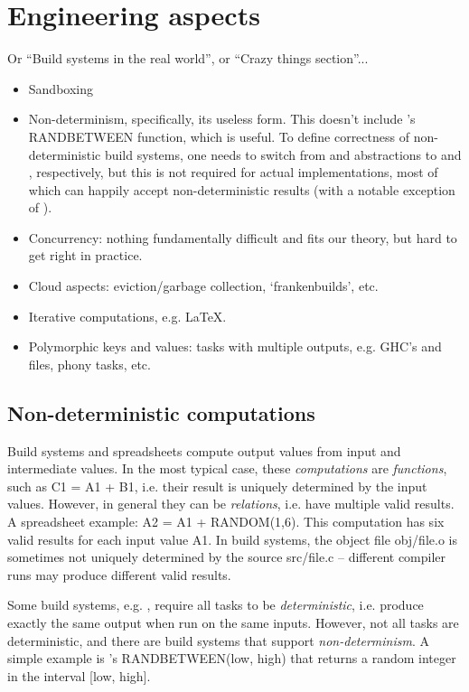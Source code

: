 \clearpage
\section{Engineering aspects}\label{sec-engineering}

Or ``Build systems in the real world'', or ``Crazy things section''...

\begin{itemize}
    \item Sandboxing
    \item Non-determinism, specifically, its useless form. This doesn't
          include \Excel's \textsf{RANDBETWEEN} function, which is useful.
          To define correctness of non-deterministic build systems, one needs to
          switch from  and  abstractions to
           and , respectively, but this is not
          required for actual implementations, most of which can happily accept
          non-deterministic results (with a notable exception of \Buck).
    \item Concurrency: nothing fundamentally difficult and fits our theory, but
          hard to get right in practice.
    \item Cloud aspects: eviction/garbage collection, `frankenbuilds', etc.
    \item Iterative computations, e.g. LaTeX.
    \item Polymorphic keys and values: tasks with multiple outputs, e.g. GHC's
           and  files, phony tasks, etc.
\end{itemize}

\subsection{Non-deterministic computations}

Build systems and spreadsheets compute output values from input and intermediate
values. In the most typical case, these \emph{computations} are \emph{functions},
such as \textsf{C1 = A1 + B1}, i.e. their result is uniquely determined by the
input values. However, in general they can be \emph{relations}, i.e. have
multiple valid results. A spreadsheet example: \textsf{A2 = A1 + RANDOM(1,6)}.
This computation has six valid results for each input value \textsf{A1}. In
build systems, the object file \textsf{obj/file.o} is sometimes not uniquely
determined by the source \textsf{src/file.c} -- different compiler runs may
produce different valid results.

Some build systems, e.g. \Buck, require all tasks to be
\emph{deterministic}, i.e. produce exactly the same output when run on the
same inputs. However, not all tasks are deterministic, and there are build
systems that support \emph{non-determinism}. A simple example is \Excel's
\textsf{RANDBETWEEN(low, high)} that returns a random integer in the
interval \textsf{[low, high]}.